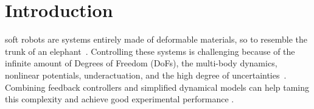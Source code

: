 \section{Introduction}\label{sec:backstepping:introduction}
 soft robots are systems entirely made of deformable materials, so to resemble the trunk of an elephant~\cite{della2020soft}. Controlling these systems is challenging because of the infinite amount of Degrees of Freedom (DoFs), the multi-body dynamics, nonlinear potentials, underactuation, and the high degree of uncertainties~\cite{george2018control}. 
Combining feedback controllers %
and simplified dynamical models can help taming this complexity and achieve good experimental performance \cite{thieffry2018control, della2020model, franco2021energy}.
%

%



